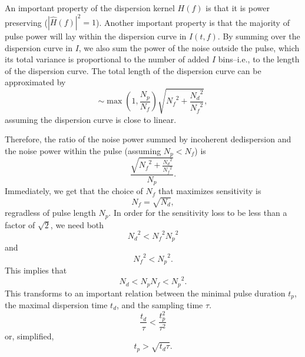\documentclass[iop]{emulateapj}
\begin{document}
An important property of the dispersion kernel $H(f)$ is that it is power preserving ($|\hat{H}(f)|^2 = 1$).
Another important property is that the majority of pulse power will lay within the dispersion curve in $I(t,f)$.
By summing over the dispersion curve in  $I$, we also sum the power of the noise outside the pulse, which its total variance is proportional to the number of added $I$ bins--i.e., to the length of the dispersion curve.
The total length of the dispersion curve can be approximated by \begin{equation}\sim\max\left(1,\frac{{N_{p}}}{{N_{f}}}\right)\sqrt{{N_{f}}^2+\frac{{N_{d}}^2}{{N_{f}}^2}},\end{equation} assuming the dispersion curve is close to linear.

Therefore, the ratio of the noise power summed by incoherent dedispersion and the noise power within the pulse (assuming ${N_{p}}<{N_{f}}$) is \begin{equation}\frac{\sqrt{{N_{f}}^2+\frac{{N_{d}}^2}{{N_{f}}^2}}}{{N_{p}}}.\end{equation} 
Immediately, we get that the choice of ${N_{f}}$ that maximizes sensitivity is \begin{equation}
{N_{f}} = \sqrt{{N_{d}}},
\end{equation} regradless of pulse length ${N_{p}}$. In order for the sensitivity loss to be less than a factor of $\sqrt{2}$, we need both \begin{equation}{N_{d}}^2 < {N_{f}}^2{N_{p}}^2\end{equation} and \begin{equation}{N_{f}}^2 < {N_{p}}^2.\end{equation} 
This implies that \begin{equation}{N_{d}} < {N_{p}}{N_{f}} < {N_{p}}^2.\end{equation}
This transforms to an important relation between the minimal pulse duration $t_p$, the maximal dispersion time $t_d$, and the sampling time $\tau$.
\begin{equation}
\frac{t_d}{\tau} < \frac{t_p^2}{\tau^2}
\end{equation} 
or, simplified,
\begin{equation}
t_p > \sqrt{t_d\tau}.
\end{equation}
\end{document}
